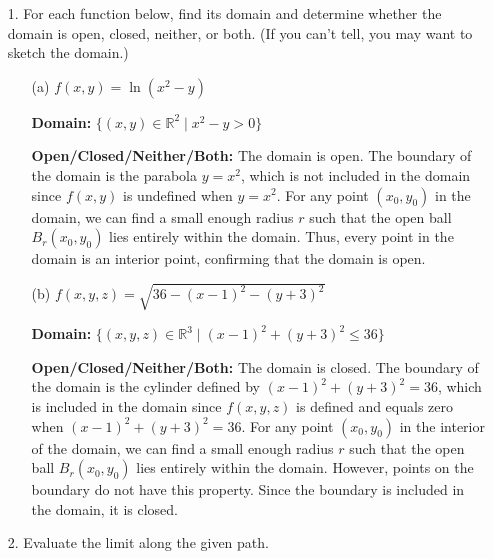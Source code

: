 \documentclass[reqno, 12pt]{amsart}
\begin{document}
\newpage
\begin{itemize}
  \item[1.] For each function below, find its domain and determine whether the domain is open, closed, neither, or both. (If you can't tell, you may want to sketch the domain.)
    \medskip

    \begin{itemize}
      \item[(a)] $f(x,y) = \ln(x^2-y)$
        \newline

        \begin{answerbox}
          \textbf{Domain:} $\{(x,y) \in \mathbb{R}^2 \mid x^2 - y > 0\}$

          \textbf{Open/Closed/Neither/Both:} The domain is open. The boundary of the domain is the parabola $y = x^2$, which is not included in the domain since $f(x,y)$ is undefined when $y = x^2$. For any point $(x_0, y_0)$ in the domain, we can find a small enough radius $r$ such that the open ball $B_r(x_0, y_0)$ lies entirely within the domain. Thus, every point in the domain is an interior point, confirming that the domain is open.
        \end{answerbox}
        \vspace{0.5 in}

      \item[(b)] $f(x,y,z) = \sqrt{36-(x-1)^2-(y+3)^2}$
        \newline

        \begin{answerbox}
          \textbf{Domain:} $\{(x,y,z) \in \mathbb{R}^3 \mid (x-1)^2 + (y+3)^2 \leq 36\}$

          \textbf{Open/Closed/Neither/Both:} The domain is closed. The boundary of the domain is the cylinder defined by $(x-1)^2 + (y+3)^2 = 36$, which is included in the domain since $f(x,y,z)$ is defined and equals zero when $(x-1)^2 + (y+3)^2 = 36$. For any point $(x_0, y_0)$ in the interior of the domain, we can find a small enough radius $r$ such that the open ball $B_r(x_0, y_0)$ lies entirely within the domain. However, points on the boundary do not have this property. Since the boundary is included in the domain, it is closed.
        \end{answerbox}
        \vspace{0.5 in}
    \end{itemize}

  \item[2.] Evaluate the limit along the given path.


\end{itemize}
\end{document}
